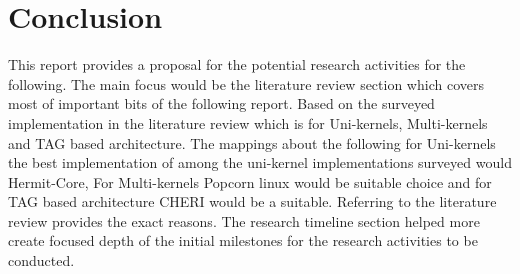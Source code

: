 
\chapter{Conclusion}  %
This report provides a proposal for the potential research 
activities for the following. The main focus would be 
the literature review section which covers most of important 
bits of the following report. Based on the surveyed implementation 
in the literature review which is for Uni-kernels, Multi-kernels 
and TAG based architecture. The mappings about the following 
for Uni-kernels the best implementation of among the uni-kernel 
implementations surveyed would Hermit-Core, For Multi-kernels 
Popcorn linux would be suitable choice and for TAG based architecture
CHERI would be a suitable. Referring to the literature review 
provides the exact reasons. The research timeline section helped
more create focused depth of the initial milestones for the research 
activities to be conducted. 

